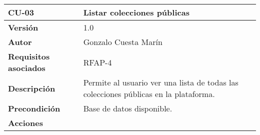 \begin{longtable}[]{@{}ll@{}}
\toprule
\begin{minipage}[b]{0.22\columnwidth}\raggedright
\textbf{CU-03}\strut
\end{minipage} & \begin{minipage}[b]{0.72\columnwidth}\raggedright
\textbf{Listar colecciones públicas}\strut
\end{minipage}\tabularnewline
\midrule
\endhead
\begin{minipage}[t]{0.22\columnwidth}\raggedright
\textbf{Versión}\strut
\end{minipage} & \begin{minipage}[t]{0.72\columnwidth}\raggedright
1.0\strut
\end{minipage}\tabularnewline
\begin{minipage}[t]{0.22\columnwidth}\raggedright
\textbf{Autor}\strut
\end{minipage} & \begin{minipage}[t]{0.72\columnwidth}\raggedright
Gonzalo Cuesta Marín\strut
\end{minipage}\tabularnewline
\begin{minipage}[t]{0.22\columnwidth}\raggedright
\textbf{Requisitos asociados}\strut
\end{minipage} & \begin{minipage}[t]{0.72\columnwidth}\raggedright
RFAP-4\strut
\end{minipage}\tabularnewline
\begin{minipage}[t]{0.22\columnwidth}\raggedright
\textbf{Descripción}\strut
\end{minipage} & \begin{minipage}[t]{0.72\columnwidth}\raggedright
Permite al usuario ver una lista de todas las colecciones públicas en la
plataforma.\strut
\end{minipage}\tabularnewline
\begin{minipage}[t]{0.22\columnwidth}\raggedright
\textbf{Precondición}\strut
\end{minipage} & \begin{minipage}[t]{0.72\columnwidth}\raggedright
Base de datos disponible.\strut
\end{minipage}\tabularnewline
\begin{minipage}[t]{0.22\columnwidth}\raggedright
\textbf{Acciones}\strut
\end{minipage} & \begin{minipage}[t]{0.72\columnwidth}\raggedright
\begin{enumerate}

\end{enumerate}
\end{minipage}
\end{longtable}
